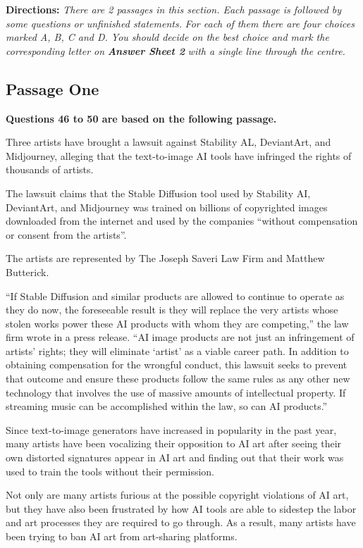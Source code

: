 \documentclass[UTF8,11pt]{ctexart}
\begin{document}
\textbf{Directions: }\textit{There are 2 passages in this section. Each passage is followed by some questions or unfinished statements.} \textit{For each of them there are four choices marked A, B, C and D. You should decide on the best choice and mark the} \textit{corresponding letter on }\textbf{\textit{Answer Sheet 2}}\textit{ with a single line through the centre.}


\subsection*{\textbf{Passage One}}


\textbf{Questions 46 to 50 are based on the following passage.}


Three artists have brought a lawsuit against Stability AL, DeviantArt, and Midjourney, alleging that the text-to-image AI tools have infringed the rights of thousands of artists.


The lawsuit claims that the Stable Diffusion tool used by Stability AI, DeviantArt, and Midjourney was trained on billions of copyrighted images downloaded from the internet and used by the companies “without compensation or consent from the artists”.


The artists are represented by The Joseph Saveri Law Firm and Matthew Butterick.


“If Stable Diffusion and similar products are allowed to continue to operate as they do now, the foreseeable result is they will replace the very artists whose stolen works power these AI products with whom they are competing,” the law firm wrote in a press release. “AI image products are not just an infringement of artists’ rights; they will eliminate ‘artist’ as a viable career path. In addition to obtaining compensation for the wrongful conduct, this lawsuit seeks to prevent that outcome and ensure these products follow the same rules as any other new technology that involves the use of massive amounts of intellectual property. If streaming music can be accomplished within the law, so can AI products.”


Since text-to-image generators have increased in popularity in the past year, many artists have been vocalizing their opposition to AI art after seeing their own distorted signatures appear in AI art and finding out that their work was used to train the tools without their permission.


Not only are many artists furious at the possible copyright violations of AI art, but they have also been frustrated by how AI tools are able to sidestep the labor and art processes they are required to go through. As a result, many artists have been trying to ban AI art from art-sharing platforms.
\end{document}
